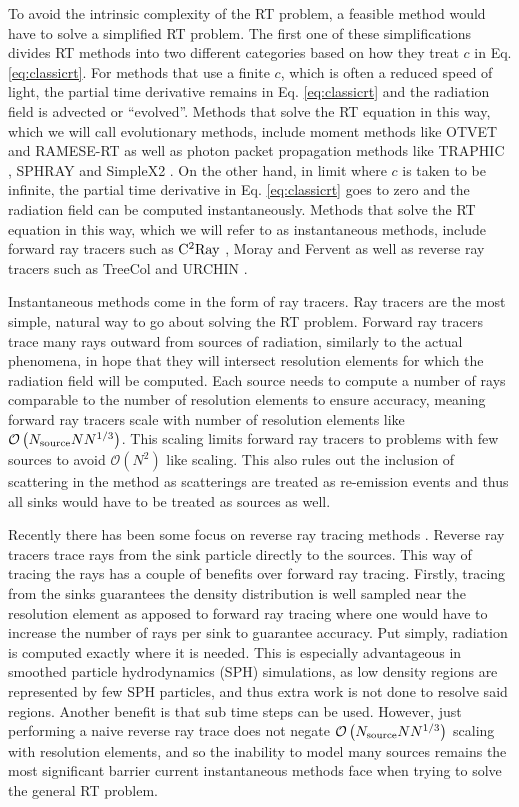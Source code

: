 \documentclass[fleq,usenatbib]{mnras}
\newcommand{\bigO}[1]{\mathcal{O}\left(#1\right)}
\newcommand{\NS}{N_{\rm source}}
\begin{document}
To avoid the intrinsic complexity of the RT problem, a feasible method would 
have to solve a simplified RT problem. The first one of these simplifications 
divides RT methods into two different categories based on how they treat $c$ 
in Eq. \ref{eq:classicrt}. For methods that use a finite $c$, which is 
often a reduced speed of light, the partial time derivative remains in 
Eq. \ref{eq:classicrt} and the radiation field is advected or 
``evolved''. Methods that solve the RT equation in this way, which we will 
call evolutionary methods, include moment methods like OTVET 
\citep{gnedinAbel01} and  RAMESE-RT \citep{rosdahlTeyssier15} as well as 
photon packet propagation methods like TRAPHIC \citep{pawlikSchaye08}, SPHRAY 
\citep{altayEt08} and SimpleX2 \citep{paardekooperEt10}. On the other hand, in 
limit where $c$ is taken to be infinite, the partial time derivative in 
Eq. \ref{eq:classicrt} goes to zero and the radiation field can be 
computed instantaneously. Methods that solve the RT equation in this way, 
which we will refer to as instantaneous methods, include forward ray tracers 
such as $\rm C^2Ray$ \citep{mellemaEt06a}, Moray \citep{wiseAbel11} and 
Fervent \citep{baczynskiEt15} as well as reverse ray tracers such as TreeCol 
\citep{clarkEt12} and URCHIN \citep{altayTheuns13}. 

Instantaneous methods come in the form of ray tracers. Ray tracers are the most
 simple, natural way to go about solving the RT problem. Forward ray tracers 
trace many rays outward from sources of radiation, similarly to the actual 
phenomena, in hope that they will intersect resolution elements for which the 
radiation field will be computed. Each source needs to compute a number of rays
 comparable to the number of resolution elements to ensure accuracy, 
meaning forward ray tracers scale with number of resolution elements like 
$\bigO{\NS N N^{1/3}}$. This scaling limits forward ray 
tracers to problems with few sources to avoid $\mathcal{O}(N^2)$ like scaling. 
This also rules out the inclusion of scattering in the method as scatterings 
are treated as re-emission events and thus all sinks would have to be treated 
as sources as well. 

Recently there has been some focus on reverse ray tracing methods 
\citep{clarkEt12, altayTheuns13}. Reverse ray tracers trace rays from the sink 
particle directly to the sources. This way of tracing the rays has a couple of 
benefits over forward ray tracing. Firstly, tracing from the sinks guarantees 
the density distribution is well sampled near the resolution element as 
apposed to forward ray tracing where one would have to increase the number of 
rays per sink to guarantee accuracy. Put simply, radiation is computed exactly 
where it is needed. This is especially advantageous in smoothed particle 
hydrodynamics (SPH) simulations, as low density regions are represented by 
few SPH particles, and thus extra work is not done to resolve said regions. 
Another benefit is that sub time steps can be used. 
However, just performing a naive reverse ray trace does not negate 
$\bigO{\NS N N^{1/3}}$ scaling with resolution elements, and so the inability 
to model many sources remains the most significant barrier current 
instantaneous methods face when trying to solve the general RT problem.
\end{document}
